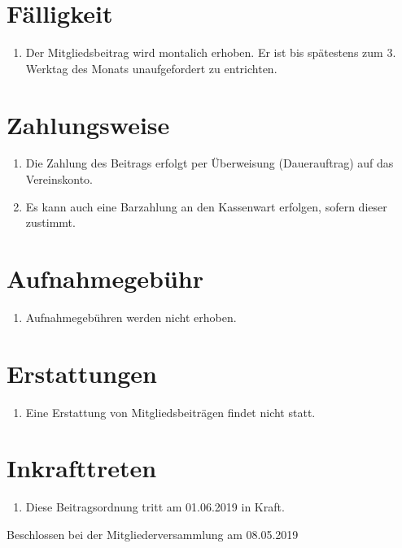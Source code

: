 \documentclass[a4paper, 12pt]{scrartcl}
\begin{document}
\section{Fälligkeit}
\begin{enumerate}
	\item Der Mitgliedsbeitrag wird montalich erhoben. Er ist bis spätestens zum 3. Werktag des Monats unaufgefordert zu entrichten.
\end{enumerate}

\section{Zahlungsweise}
\begin{enumerate}
	\item Die Zahlung des Beitrags erfolgt per Überweisung (Dauerauftrag) auf das Vereinskonto.
	\item Es kann auch eine Barzahlung an den Kassenwart erfolgen, sofern dieser zustimmt.
\end{enumerate}

\section{Aufnahmegebühr}
\begin{enumerate}
	\item Aufnahmegebühren werden nicht erhoben.
\end{enumerate}

\section{Erstattungen}
\begin{enumerate}
	\item Eine Erstattung von Mitgliedsbeiträgen findet nicht statt.
\end{enumerate}

\section{Inkrafttreten}
\begin{enumerate}
	\item Diese Beitragsordnung tritt am 01.06.2019 in Kraft.
\end{enumerate}


\vspace{2.5cm}

\noindent Beschlossen bei der Mitgliederversammlung am 08.05.2019

\end{document}
